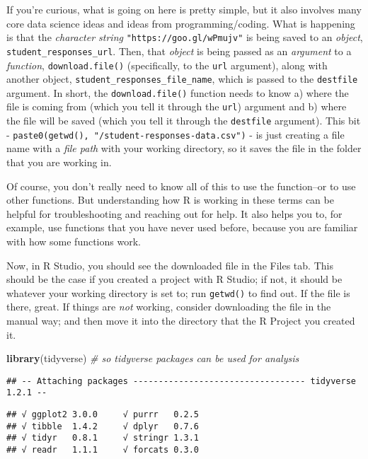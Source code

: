 \documentclass[]{article}
\newenvironment{Shaded}{\begin{snugshade}}{\end{snugshade}}
\newcommand{\KeywordTok}[1]{\textcolor[rgb]{0.13,0.29,0.53}{\textbf{#1}}}
\newcommand{\CommentTok}[1]{\textcolor[rgb]{0.56,0.35,0.01}{\textit{#1}}}
\newcommand{\NormalTok}[1]{#1}
\begin{document}
If you're curious, what is going on here is pretty simple, but it also
involves many core data science ideas and ideas from programming/coding.
What is happening is that the \emph{character string}
\texttt{"https://goo.gl/wPmujv"} is being saved to an \emph{object},
\texttt{student\_responses\_url}. Then, that \emph{object} is being
passed as an \emph{argument} to a \emph{function},
\texttt{download.file()} (specifically, to the \texttt{url} argument),
along with another object, \texttt{student\_responses\_file\_name},
which is passed to the \texttt{destfile} argument. In short, the
\texttt{download.file()} function needs to know a) where the file is
coming from (which you tell it through the \texttt{url}) argument and b)
where the file will be saved (which you tell it through the
\texttt{destfile} argument). This bit -
\texttt{paste0(getwd(),\ "/student-responses-data.csv")} - is just
creating a file name with a \emph{file path} with your working
directory, so it saves the file in the folder that you are working in.

Of course, you don't really need to know all of this to use the
function--or to use other functions. But understanding how R is working
in these terms can be helpful for troubleshooting and reaching out for
help. It also helps you to, for example, use functions that you have
never used before, because you are familiar with how some functions
work.

Now, in R Studio, you should see the downloaded file in the Files tab.
This should be the case if you created a project with R Studio; if not,
it should be whatever your working directory is set to; run
\texttt{getwd()} to find out. If the file is there, great. If things are
\emph{not} working, consider downloading the file in the manual way; and
then move it into the directory that the R Project you created it.

\begin{Shaded}
\begin{Highlighting}[]
\KeywordTok{library}\NormalTok{(tidyverse) }\CommentTok{# so tidyverse packages can be used for analysis}
\end{Highlighting}
\end{Shaded}

\begin{verbatim}
## -- Attaching packages ---------------------------------- tidyverse 1.2.1 --
\end{verbatim}

\begin{verbatim}
## √ ggplot2 3.0.0     √ purrr   0.2.5
## √ tibble  1.4.2     √ dplyr   0.7.6
## √ tidyr   0.8.1     √ stringr 1.3.1
## √ readr   1.1.1     √ forcats 0.3.0
\end{verbatim}
\end{document}
